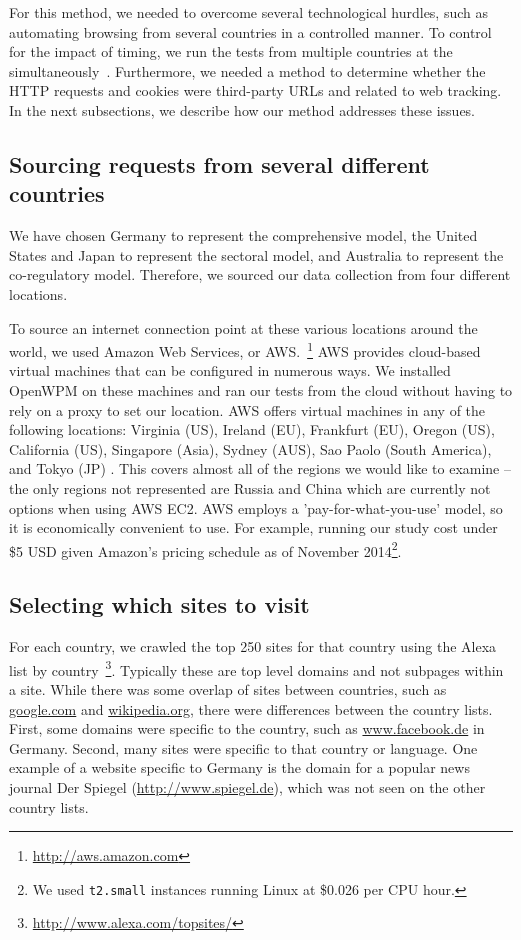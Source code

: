 \documentclass[conference]{IEEEtran}
\newcommand{\todo}[1]{}
\renewcommand{\todo}[1]{{\color{red} TODO: {#1}}}
\begin{document}
For this method, we needed to overcome several technological hurdles, such as automating browsing from several countries in a controlled manner. To control for the impact of timing, we run the tests from multiple countries at the simultaneously~\cite{guha2010challenges}. Furthermore, we needed a method to determine whether the HTTP requests and cookies were third-party URLs and related to web tracking. In the next subsections, we describe how our method addresses these issues.

\subsection{Sourcing requests from several different countries}

We have chosen Germany to represent the comprehensive model, the United States and Japan to represent the sectoral model, and Australia to represent the co-regulatory model. Therefore, we sourced our data collection from four different locations.

To source an internet connection point at these various locations around the world, we used Amazon Web Services, or AWS.~\footnote{\url{http://aws.amazon.com}} AWS provides cloud-based virtual machines that can be configured in numerous ways. We installed OpenWPM on these machines and ran our tests from the cloud without having to rely on a proxy to set our location. AWS offers virtual machines in any of the following locations: Virginia (US), Ireland (EU), Frankfurt (EU), Oregon (US), California (US), Singapore (Asia), Sydney (AUS), Sao Paolo (South America), and Tokyo (JP) \cite{amazonregion}. This covers almost all of the regions we would like to examine -- the only regions not represented are Russia and China which are currently not options when using AWS EC2. AWS employs a 'pay-for-what-you-use' model, so it is economically convenient to use. For example, running our study cost under \$5 USD given Amazon's pricing schedule as of November 2014\footnote{We used \texttt{t2.small} instances running Linux at \$0.026 per CPU hour.}.

\subsection{Selecting which sites to visit}
For each country, we crawled the top 250 sites for that country using the Alexa list by country~\footnote{\url{http://www.alexa.com/topsites/}}. Typically these are top level domains and not subpages within a site. While there was some overlap of sites between countries, such as \url{google.com} and \url{wikipedia.org}, there were differences between the country lists.  First, some domains were specific to the country, such as \url{www.facebook.de} in Germany.  Second, many sites were specific to that country or language.  One example of a website specific to Germany is the domain for a popular news journal Der Spiegel (\url{http://www.spiegel.de}), which was not seen on the other country lists.  
\end{document}
